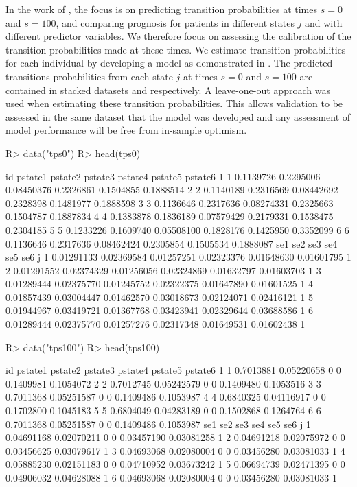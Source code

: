 \documentclass[nojss]{jss}
\begin{document}
In the work of \cite{DeWreede2011}, the focus is on predicting transition probabilities at times $s = 0$ and $s = 100$, and comparing prognosis for patients in different states $j$ and with different predictor variables. We therefore focus on assessing the calibration of the transition probabilities made at these times. We estimate transition probabilities for each individual by developing a model as demonstrated in \cite{DeWreede2011}. The predicted transitions probabilities from each state $j$ at times $s = 0$ and $s = 100$ are contained in stacked datasets  and  respectively. A leave-one-out approach was used when estimating these transition probabilities. This allows validation to be assessed in the same dataset that the model was developed and any assessment of model performance will be free from in-sample optimism.

\begin{Schunk}
\begin{Sinput}
R> data("tps0")
R> head(tps0)
\end{Sinput}
\begin{Soutput}
  id   pstate1   pstate2    pstate3   pstate4   pstate5   pstate6
1  1 0.1139726 0.2295006 0.08450376 0.2326861 0.1504855 0.1888514
2  2 0.1140189 0.2316569 0.08442692 0.2328398 0.1481977 0.1888598
3  3 0.1136646 0.2317636 0.08274331 0.2325663 0.1504787 0.1887834
4  4 0.1383878 0.1836189 0.07579429 0.2179331 0.1538475 0.2304185
5  5 0.1233226 0.1609740 0.05508100 0.1828176 0.1425950 0.3352099
6  6 0.1136646 0.2317636 0.08462424 0.2305854 0.1505534 0.1888087
         se1        se2        se3        se4        se5        se6 j
1 0.01291133 0.02369584 0.01257251 0.02323376 0.01648630 0.01601795 1
2 0.01291552 0.02374329 0.01256056 0.02324869 0.01632797 0.01603703 1
3 0.01289444 0.02375770 0.01245752 0.02322375 0.01647890 0.01601525 1
4 0.01857439 0.03004447 0.01462570 0.03018673 0.02124071 0.02416121 1
5 0.01944967 0.03419721 0.01367768 0.03423941 0.02329644 0.03688586 1
6 0.01289444 0.02375770 0.01257276 0.02317348 0.01649531 0.01602438 1
\end{Soutput}
\begin{Sinput}
R> data("tps100")
R> head(tps100)
\end{Sinput}
\begin{Soutput}
  id   pstate1    pstate2 pstate3 pstate4   pstate5   pstate6
1  1 0.7013881 0.05220658       0       0 0.1409981 0.1054072
2  2 0.7012745 0.05242579       0       0 0.1409480 0.1053516
3  3 0.7011368 0.05251587       0       0 0.1409486 0.1053987
4  4 0.6840325 0.04116917       0       0 0.1702800 0.1045183
5  5 0.6804049 0.04283189       0       0 0.1502868 0.1264764
6  6 0.7011368 0.05251587       0       0 0.1409486 0.1053987
         se1        se2 se3 se4        se5        se6 j
1 0.04691168 0.02070211   0   0 0.03457190 0.03081258 1
2 0.04691218 0.02075972   0   0 0.03456625 0.03079617 1
3 0.04693068 0.02080004   0   0 0.03456280 0.03081033 1
4 0.05885230 0.02151183   0   0 0.04710952 0.03673242 1
5 0.06694739 0.02471395   0   0 0.04906032 0.04628088 1
6 0.04693068 0.02080004   0   0 0.03456280 0.03081033 1
\end{Soutput}
\end{Schunk}
\end{document}
